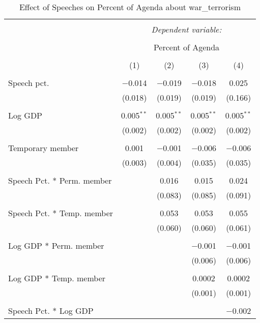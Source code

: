 
\begin{table}[!htbp] \centering 
  \caption{Effect of Speeches on Percent of Agenda about  war_terrorism} 
  \label{} 
\begin{tabular}{@{\extracolsep{5pt}}lcccc} 
\\[-1.8ex]\hline 
\hline \\[-1.8ex] 
 & \multicolumn{4}{c}{\textit{Dependent variable:}} \\ 
\cline{2-5} 
\\[-1.8ex] & \multicolumn{4}{c}{Percent of Agenda} \\ 
\\[-1.8ex] & (1) & (2) & (3) & (4)\\ 
\hline \\[-1.8ex] 
 Speech pct. & $-$0.014 & $-$0.019 & $-$0.018 & 0.025 \\ 
  & (0.018) & (0.019) & (0.019) & (0.166) \\ 
  & & & & \\ 
 Log GDP & 0.005$^{**}$ & 0.005$^{**}$ & 0.005$^{**}$ & 0.005$^{**}$ \\ 
  & (0.002) & (0.002) & (0.002) & (0.002) \\ 
  & & & & \\ 
 Temporary member & 0.001 & $-$0.001 & $-$0.006 & $-$0.006 \\ 
  & (0.003) & (0.004) & (0.035) & (0.035) \\ 
  & & & & \\ 
 Speech Pct. * Perm. member &  & 0.016 & 0.015 & 0.024 \\ 
  &  & (0.083) & (0.085) & (0.091) \\ 
  & & & & \\ 
 Speech Pct. * Temp. member &  & 0.053 & 0.053 & 0.055 \\ 
  &  & (0.060) & (0.060) & (0.061) \\ 
  & & & & \\ 
 Log GDP * Perm. member &  &  & $-$0.001 & $-$0.001 \\ 
  &  &  & (0.006) & (0.006) \\ 
  & & & & \\ 
 Log GDP * Temp. member &  &  & 0.0002 & 0.0002 \\ 
  &  &  & (0.001) & (0.001) \\ 
  & & & & \\ 
 Speech Pct. * Log GDP &  &  &  & $-$0.002 \\ 

\end{tabular}
\end{table}
